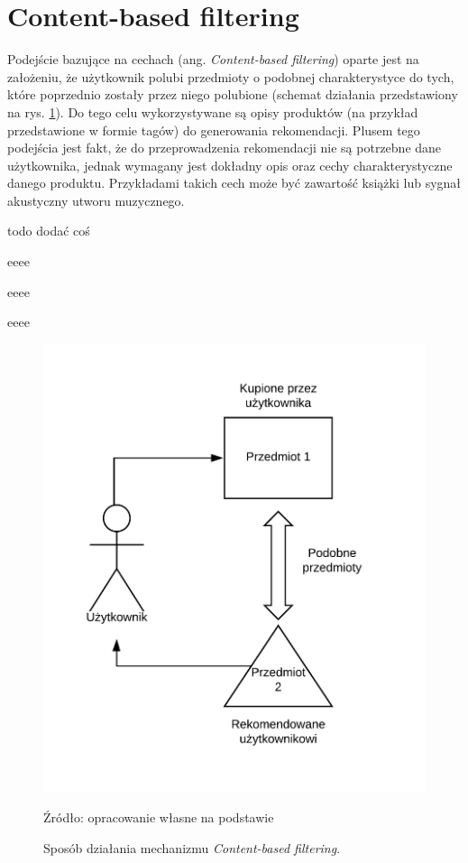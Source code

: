 \section{Content-based filtering}
Podejście bazujące na cechach (ang. \textit{Content-based filtering}) oparte jest na założeniu, że użytkownik polubi przedmioty o podobnej charakterystyce do tych, które poprzednio zostały przez niego polubione (schemat działania przedstawiony na rys. \ref{fig:content-based}). Do tego celu wykorzystywane są opisy produktów (na przykład przedstawione w formie tagów) do generowania rekomendacji. Plusem tego podejścia jest fakt, że do przeprowadzenia rekomendacji nie są potrzebne dane użytkownika, jednak wymagany jest dokładny opis oraz cechy charakterystyczne danego produktu. Przykładami takich cech może być zawartość książki lub sygnał akustyczny utworu muzycznego.


todo dodać coś

eeee

eeee

eeee

\begin{figure}
    \centering
    \includegraphics[scale=0.7]{images/content-based.png}
    \caption{Sposób działania mechanizmu \textit{Content-based filtering}.}
    Źródło: opracowanie własne na podstawie \cite{challenges_solutions_survey}
    \label{fig:content-based}
\end{figure}

